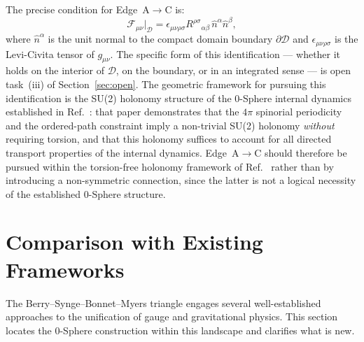 \documentclass[%
 reprint, amsmath,amssymb, aps, prd, ]{revtex4-2}
\numberwithin{equation}{section}
\newcommand{\BerryF}{\mathcal{F}}
\begin{document}
The precise condition for Edge~A$\to$C is:
\begin{equation}
\BerryF_{\mu\nu}\big|_{\mathcal{D}} = \epsilon_{\mu\nu\rho\sigma} R^{\rho\sigma}{}_{\alpha\beta}\,\hat{n}^\alpha \hat{n}^\beta,
\label{eq:edgeIII}
\end{equation}
where $\hat{n}^\alpha$ is the unit normal to the compact domain boundary $\partial\mathcal{D}$ and $\epsilon_{\mu\nu\rho\sigma}$ is the Levi-Civita tensor of $g_{\mu\nu}$.
The specific form of this identification --- whether it holds on the interior of $\mathcal{D}$, on the boundary, or in an integrated sense --- is open task~(iii) of Section~\ref{sec:open}.
The geometric framework for pursuing this identification is the SU(2) holonomy structure of the 0-Sphere internal dynamics established in Ref.~\cite{hanamura45}: that paper demonstrates that the $4\pi$ spinorial periodicity and the ordered-path constraint imply a non-trivial SU(2) holonomy \emph{without} requiring torsion, and that this holonomy suffices to account for all directed transport properties of the internal dynamics.
Edge~A$\to$C should therefore be pursued within the torsion-free holonomy framework of Ref.~\cite{hanamura45} rather than by introducing a non-symmetric connection, since the latter is not a logical necessity of the established 0-Sphere structure.

\section{Comparison with Existing Frameworks}
\label{sec:comparison}

The Berry--Synge--Bonnet--Myers triangle engages several well-established approaches to the unification of gauge and gravitational physics.
This section locates the 0-Sphere construction within this landscape and clarifies what is new.
\end{document}
